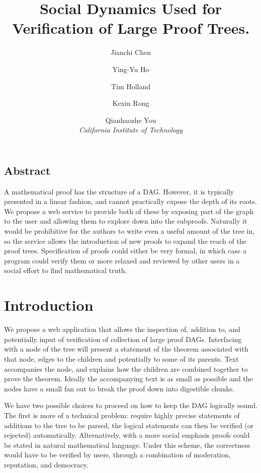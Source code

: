 \documentclass[letterpaper,twocolumn,10pt]{article}
\begin{document}
\date{}

\title{\Large \bf Social Dynamics Used for Verification of Large Proof Trees.}

\author{
{\rm Jianchi Chen}\and
{\rm Ying-Yu Ho}\and
{\rm Tim Holland}\and
{\rm Kexin Rong}\and
{\rm Qianhaozhe You}\\
{\em California Institute of Technology}
}

\maketitle

\thispagestyle{empty}

\subsection*{Abstract}
A mathematical proof has the structure of a DAG. However, it is typically
presented in a linear fashion, and cannot practically expose the depth of its
roots. We propose a web service to provide both of these by exposing part of
the graph to the user and allowing them to explore down into the subproofs.
Naturally it would be prohibitive for the authors to write even a useful amount
of the tree in, so the service allows the introduction of new proofs to expand
the reach of the proof trees. Specification of proofs could either be very
formal, in which case a program could verify them or more relaxed and reviewed
by other users in a social effort to find mathematical truth.

\section{Introduction}
We propose a web application that allows the inspection of, addition to, and
potentially input of verification of collection of large proof DAGs.
Interfacing with a node of the tree will present a statement of the theorem
associated with that node, edges to the children and potentially to some of its
parents. Text accompanies the node, and explains how the children are combined
together to prove the theorem. Ideally the accompanying text is as small as
possible and the nodes have a small fan out to break the proof down into
digestible chunks.

We have two possible choices to proceed on how to keep the DAG logically sound.
The first is more of a technical problem: require highly precise statements of
additions to the tree to be parsed, the logical statements can then be verified
(or rejected) automatically. Alternatively, with a more social emphasis proofs
could be stated in natural mathematical language. Under this scheme, the
correctness would have to be verified by users, through a combination
of moderation, reputation, and democracy.
\end{document}
